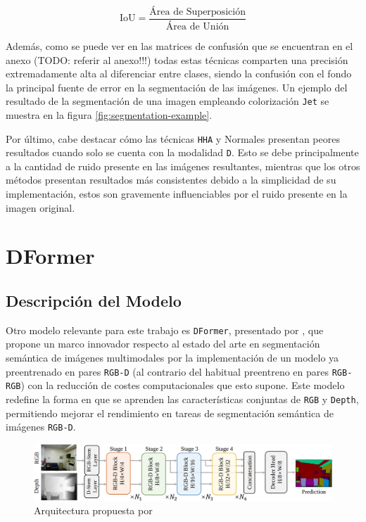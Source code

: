 \documentclass[12pt,a4paper]{report}
\begin{document}
\begin{equation}
    \text{IoU} = \frac{\text{Área de Superposición}}{\text{Área de Unión}}
    \label{eq:iou}
\end{equation}

Además, como se puede ver en las matrices de confusión que se encuentran en el anexo (TODO: referir al anexo!!!) todas estas técnicas comparten una precisión extremadamente alta al diferenciar entre clases, siendo la confusión con el fondo la principal fuente de error en la segmentación de las imágenes. Un ejemplo del resultado de la segmentación de una imagen empleando colorización \texttt{Jet} se muestra en la figura \ref{fig:segmentation-example}.

Por último, cabe destacar cómo las técnicas \texttt{HHA} y Normales presentan peores resultados cuando solo se cuenta con la modalidad \texttt{D}. Esto se debe principalmente a la cantidad de ruido presente en las imágenes resultantes, mientras que los otros métodos presentan resultados más consistentes debido a la simplicidad de su implementación, estos son gravemente influenciables por el ruido presente en la imagen original.

\chapter{DFormer}
\label{chap:dformer}
\section{Descripción del Modelo}
\label{sec:dformer_description}
Otro modelo relevante para este trabajo es \texttt{DFormer}, presentado por \cite{yin2024dformerrethinkingrgbdrepresentation}, que propone un marco innovador respecto al estado del arte en segmentación semántica de imágenes multimodales por la implementación de un modelo ya preentrenado en pares \texttt{RGB-D} (al contrario del habitual preentreno en pares \texttt{RGB-RGB}) con la reducción de costes computacionales que esto supone. Este modelo redefine la forma en que se aprenden las características conjuntas de \texttt{RGB} y \texttt{Depth}, permitiendo mejorar el rendimiento en tareas de segmentación semántica de imágenes \texttt{RGB-D}.

\begin{figure}[!h] 
    \centering 
    \includegraphics[width=\textwidth]{media/model/dformer_architecture.png}
    \caption{Arquitectura propuesta por \cite{yin2024dformerrethinkingrgbdrepresentation}} 
    \label{fig:dformer-architecture}
\end{figure}
\end{document}
